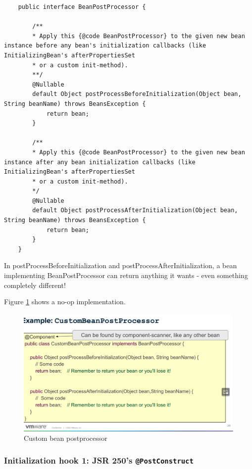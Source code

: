 \documentclass{scrartcl}
\begin{document}
\begin{lstlisting}
    public interface BeanPostProcessor {

        /**
        * Apply this {@code BeanPostProcessor} to the given new bean instance before any bean's initialization callbacks (like InitializingBean's afterPropertiesSet
        * or a custom init-method).
        **/
        @Nullable
        default Object postProcessBeforeInitialization(Object bean, String beanName) throws BeansException {
            return bean;
        }

        /**
        * Apply this {@code BeanPostProcessor} to the given new bean instance after any bean initialization callbacks (like InitializingBean's afterPropertiesSet
        * or a custom init-method).
        */
        @Nullable
        default Object postProcessAfterInitialization(Object bean, String beanName) throws BeansException {
            return bean;
        }
    }
\end{lstlisting}

In postProcessBeforeInitialization and postProcessAfterInitialization, a bean implementing BeanPostProcessor can return anything it wants - even something completely different!

Figure \ref{fig:custom_bean_postprocessor} shows a no-op implementation.

\begin{figure}
    \centering
    \includegraphics[width=1\linewidth]{custom_bean_postprocessor}
    \caption{Custom bean postprocessor}
    \label{fig:custom_bean_postprocessor}
\end{figure}

\subsubsection{Initialization hook 1: JSR 250's \lstinline|@PostConstruct|}
\end{document}

